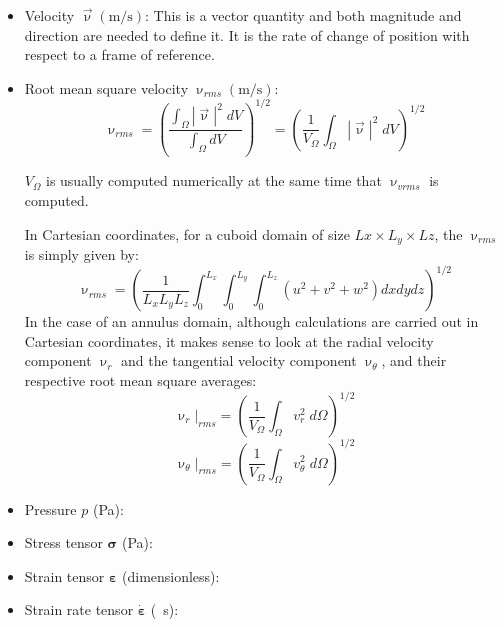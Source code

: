 \begin{itemize}
\item {\color{violet} Velocity} $\vec \upnu (\text{m/s})$: This is a vector quantity and both magnitude and direction are needed to define it. It is the rate of change of position with respect to a frame of reference.
\item {\color{violet} Root mean square velocity} $\upnu_{rms} (\text{m/s})$: 
\begin{equation}
\upnu_{rms} = \left ( \frac{\int_\Omega |{\vec \upnu}|^2 \;  dV}{\int_\Omega dV }  \right )^{1/2}
=\left ( \frac{1}{V_\Omega} \int_\Omega |{\vec \upnu}|^2 \;  dV \right )^{1/2} \label{eqVrms}
\end{equation}
\begin{remark}
$V_\Omega$ is usually computed numerically at the same time that $\upnu_{vrms}$ is computed.
\end{remark}
In Cartesian coordinates, for a cuboid domain of size $Lx\times L_y \times Lz$, 
the $\upnu_{rms}$ is simply given by:
\begin{equation}
\upnu_{rms}  = \left ( \frac{1}{L_xL_yL_z} \int_0^{L_x}\int_0^{L_y}\int_0^{L_z} 
(u^2 + v^2 + w^2) dxdydz  \right )^{1/2}
\end{equation}
In the case of an annulus domain, although calculations are carried out 
in Cartesian coordinates, it makes sense
to look at the radial velocity component $\upnu_r$ and the tangential velocity 
component $\upnu_\theta$, and their respective
root mean square averages:
\begin{equation}
\upnu_r|_{rms}  =\left ( \frac{1}{V_\Omega} \int_\Omega v_r^2 \;  d \Omega \right )^{1/2} \label{eqVrVrms}
\end{equation}
\begin{equation}
\upnu_\theta|_{rms}  = \left ( \frac{1}{V_\Omega} \int_\Omega v_\theta^2 \;  d \Omega \right )^{1/2} \label{eqThetaVrms}
\end{equation}


\item {\color{violet} Pressure} $p$ (\si{\pascal}):
\item {\color{violet} Stress tensor} ${\bm \sigma}$ (\si{\pascal}): 
\item {\color{violet} Strain tensor} ${\bm \varepsilon}$ (dimensionless): 
\item {\color{violet} Strain rate tensor} $ \dot{\bm \varepsilon}$ (\si{\per\second}): 


\end{itemize}
